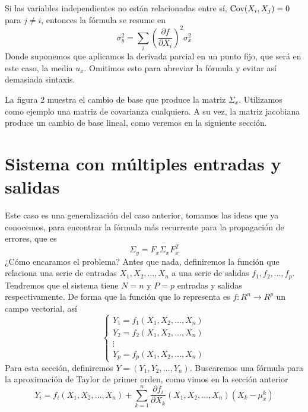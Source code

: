 \documentclass[a4paper, 10pt]{article}
\begin{document}
Si las variables independientes no están relacionadas entre sí, $\textnormal{Cov}(X_i, X_j) = 0$ para $j\neq i$,
entonces la fórmula se resume en
\begin{equation}
    \sigma_y^{2} = \sum_{i}^{}\left(\dfrac{\partial f}{\partial X_i}\right)^{2}\sigma^{2}_x
\end{equation}
Donde suponemos que aplicamos la derivada parcial en un punto fijo, que será en este caso, la media $u_x$.
Omitimos esto para abreviar la fórmula y evitar así demasiada sintaxis.

La figura 2 muestra el cambio de base que produce la matriz $\Sigma_x$. Utilizamos como ejemplo una matriz de covarianza cualquiera.
A su vez, la matriz jacobiana produce un cambio de base lineal, como veremos en la siguiente sección.
\section{Sistema con múltiples entradas y salidas}
Este caso es una generalización del caso anterior, tomamos las ideas que ya conocemos, para encontrar la fórmula
más recurrente para la propagación de errores, que es
\begin{equation}
    \Sigma_y = F_x \Sigma_x F_x^{T}
\end{equation}
¿Cómo encaramos el problema? Antes que nada, definiremos la función que relaciona una serie de entradas $X_1,X_2,\dots,X_n$ a una serie de salidas $f_1,f_2,\dots,f_p$.
Tendremos que el sistema tiene $N=n$ y $P=p$ entradas y salidas respectivamente. De forma que la función que lo representa es $f:R^{n} \to R^{p}$ un campo vectorial, así
\begin{equation}
    \begin{cases}
        Y_1 = f_1(X_1,X_2,\dots,X_n) \\
        Y_2 = f_2(X_1,X_2,\dots,X_n) \\
        \vdots                       \\
        Y_p = f_p(X_1,X_2,\dots,X_n)
    \end{cases}
\end{equation}
Para esta sección, definiremos $Y=\left(Y_1,Y_2,\dots,Y_n\right)$.
Buscaremos una fórmula para la aproximación de Taylor de primer orden, como vimos en la sección anterior
\begin{equation}
    Y_i = f_i(X_1,X_2,\dots,X_n) + \sum_{k=1}^{n}{\dfrac{\partial f_i}{\partial X_k}
    \left(X_1,X_2,\dots,X_n\right)\left(X_k - \mu_{x}^{k}\right)}
\end{equation}
\end{document}
